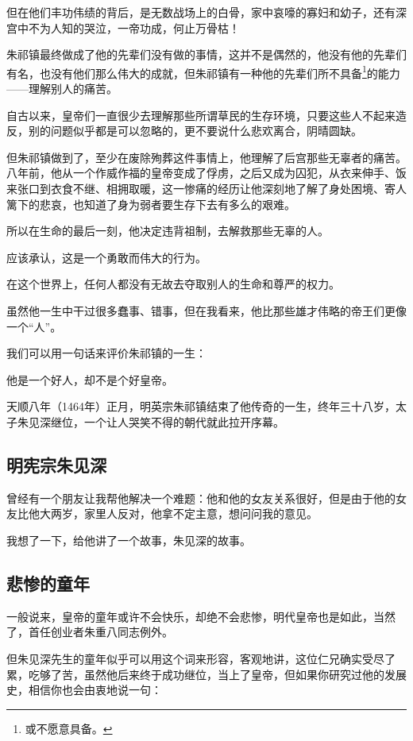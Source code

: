 \begin{multicols}{\theparacolNo}
		但在他们丰功伟绩的背后，是无数战场上的白骨，家中哀嚎的寡妇和幼子，还有深宫中不为人知的哭泣，一帝功成，何止万骨枯！

		朱祁镇最终做成了他的先辈们没有做的事情，这并不是偶然的，他没有他的先辈们有名，也没有他们那么伟大的成就，但朱祁镇有一种他的先辈们所不具备\footnote{或不愿意具备。}的能力——理解别人的痛苦。

		自古以来，皇帝们一直很少去理解那些所谓草民的生存环境，只要这些人不起来造反，别的问题似乎都是可以忽略的，更不要说什么悲欢离合，阴晴圆缺。

		但朱祁镇做到了，至少在废除殉葬这件事情上，他理解了后宫那些无辜者的痛苦。八年前，他从一个作威作福的皇帝变成了俘虏，之后又成为囚犯，从衣来伸手、饭来张口到衣食不继、相拥取暖，这一惨痛的经历让他深刻地了解了身处困境、寄人篱下的悲哀，也知道了身为弱者要生存下去有多么的艰难。

		所以在生命的最后一刻，他决定违背祖制，去解救那些无辜的人。

		应该承认，这是一个勇敢而伟大的行为。

		在这个世界上，任何人都没有无故去夺取别人的生命和尊严的权力。

		虽然他一生中干过很多蠢事、错事，但在我看来，他比那些雄才伟略的帝王们更像一个“人”。

		我们可以用一句话来评价朱祁镇的一生：

		他是一个好人，却不是个好皇帝。

		天顺八年（1464年）正月，明英宗朱祁镇结束了他传奇的一生，终年三十八岁，太子朱见深继位，一个让人哭笑不得的朝代就此拉开序幕。

		\subsection{明宪宗朱见深}
		曾经有一个朋友让我帮他解决一个难题：他和他的女友关系很好，但是由于他的女友比他大两岁，家里人反对，他拿不定主意，想问问我的意见。

		我想了一下，给他讲了一个故事，朱见深的故事。

		\subsection{悲惨的童年}
		一般说来，皇帝的童年或许不会快乐，却绝不会悲惨，明代皇帝也是如此，当然了，首任创业者朱重八同志例外。

		但朱见深先生的童年似乎可以用这个词来形容，客观地讲，这位仁兄确实受尽了累，吃够了苦，虽然他后来终于成功继位，当上了皇帝，但如果你研究过他的发展史，相信你也会由衷地说一句：


\end{multicols}
